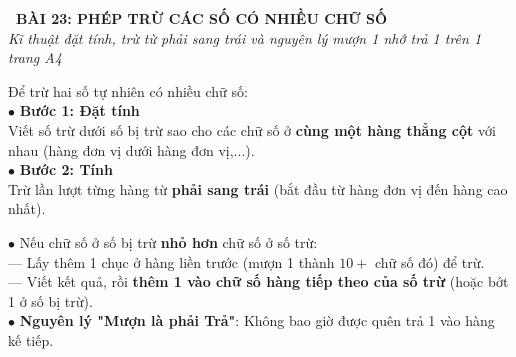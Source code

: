 \documentclass[14pt,a4paper,oneside]{extbook}
\begin{document}
\noindent
\begin{tcolorbox}[
  enhanced,
  colback=teal!8!white,
  colframe=teal!80!black,
  arc=3mm, boxrule=1pt,
  left=3mm, right=3mm, top=2mm, bottom=2mm,
  halign=center
]
  {\Large\bfseries\color{teal!90!black}\faBookmark\ BÀI 23: PHÉP TRỪ CÁC SỐ CÓ NHIỀU CHỮ SỐ}\\[1.5pt]
  {\footnotesize\itshape\color{black!75} Kĩ thuật đặt tính, trừ từ phải sang trái và nguyên lý mượn 1 nhớ trả 1 trên 1 trang A4}
\end{tcolorbox}

\vspace{2mm}

\noindent
\begin{minipage}[t]{0.49\textwidth}
  \begin{tcolorbox}[
    enhanced,
    title={\footnotesize\bfseries\color{white}\faMinusSquare\ 1. Quy tắc Đặt tính rồi tính},
    colback=blue!2!white,
    colframe=blue!75!black,
    arc=2.5mm, boxrule=0.8pt, top=1.8mm, bottom=1.8mm, left=2mm, right=2mm
  ]
    \footnotesize
    Để trừ hai số tự nhiên có nhiều chữ số:\\
    $\bullet$ \textbf{Bước 1: Đặt tính}\\
    Viết số trừ dưới số bị trừ sao cho các chữ số ở \textbf{cùng một hàng thẳng cột} với nhau (hàng đơn vị dưới hàng đơn vị,...).\\
    $\bullet$ \textbf{Bước 2: Tính}\\
    Trừ lần lượt từng hàng từ \textbf{phải sang trái} (bắt đầu từ hàng đơn vị đến hàng cao nhất).
  \end{tcolorbox}
\end{minipage}%
\hfill
\begin{minipage}[t]{0.49\textwidth}
  \begin{tcolorbox}[
    enhanced,
    title={\footnotesize\bfseries\color{white}\faHistory\ 2. Kĩ thuật trừ có nhớ (Mượn -- Trả)},
    colback=teal!2!white,
    colframe=teal!75!black,
    arc=2.5mm, boxrule=0.8pt, top=1.8mm, bottom=1.8mm, left=2mm, right=2mm
  ]
    \footnotesize
    $\bullet$ Nếu chữ số ở số bị trừ \textbf{nhỏ hơn} chữ số ở số trừ:\\
    --- Lấy thêm 1 chục ở hàng liền trước (mượn 1 thành $10 +$ chữ số đó) để trừ.\\
    --- Viết kết quả, rồi \textbf{thêm 1 vào chữ số hàng tiếp theo của số trừ} (hoặc bớt 1 ở số bị trừ).\\
    $\bullet$ \textbf{Nguyên lý "Mượn là phải Trả"}: Không bao giờ được quên trả 1 vào hàng kế tiếp.
  \end{tcolorbox}
\end{minipage}
\end{document}
